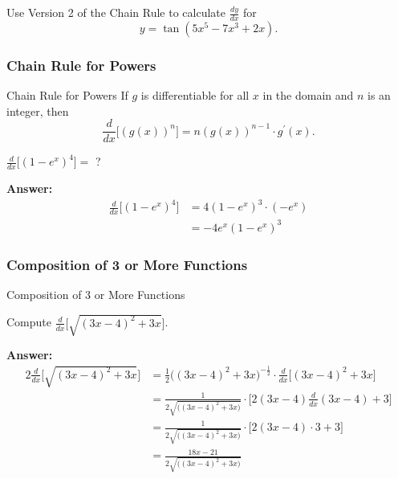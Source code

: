 \documentclass[cal1spr16Lectures.tex]{subfiles}
\begin{document}
\begin{frame}
\begin{exe}
Use Version 2 of the Chain Rule to calculate $\textstyle\frac{dy}{dx}$ for
\[
y=\tan{(5x^5-7x^3+2x)}.
\]
\end{exe}
\end{frame}

\subsubsection{Chain Rule for Powers}

\begin{frame}[allowframebreaks]{\small Chain Rule for Powers}
If $g$ is differentiable for all $x$ in the domain and $n$ is an integer, then
\[\frac{d}{dx} \bigg[\left(g(x)\right)^n \bigg]=n(g(x))^{n-1} \cdot g^{\prime}(x).\]

\framebreak
\begin{ex} $\frac{d}{dx} \bigg[ (1-e^x)^4 \bigg] =$ ? \end{ex}
{\bf Answer:}
\begin{align*}
\frac{d}{dx} \bigg[ (1-e^x)^4 \bigg] &= 4(1-e^x)^3 \cdot (-e^x) \\
 &= -4e^x (1-e^x)^3
\end{align*}
\end{frame}

\subsubsection{Composition of 3 or More Functions}

\begin{frame}[allowframebreaks]{\small Composition of 3 or More Functions}
\begin{ex}Compute $\frac{d}{dx} \bigg[ \sqrt{(3x-4)^2 + 3x} \bigg]$. \end{ex}

\framebreak\footnotesize
{\bf Answer:}
\begin{alignat*}{2}
\frac{d}{dx} \bigg[ \sqrt{(3x-4)^2 + 3x} \bigg] &= \frac{1}{2} \big( (3x-4)^2 + 3x \big)^{-\frac{1}{2}} \cdot \frac{d}{dx} \big[ (3x-4)^2 + 3x \big] \\
&= \frac{1}{2 \sqrt{ \big( (3x-4)^2 + 3x \big)}} \cdot \bigg[ 2(3x-4) \frac{d}{dx}(3x-4)  + 3 \bigg] \\
&= \frac{1}{2 \sqrt{ \big( (3x-4)^2 + 3x \big)}} \cdot \big[ 2(3x-4) \cdot 3 + 3 \big] \\
&= \frac{18x-21}{2 \sqrt{ \big( (3x-4)^2 + 3x \big)}} 
\end{alignat*}
\end{frame}
\end{document}
